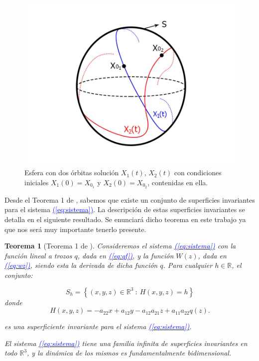 \documentclass[12pt,a4paper]{report} %
\newtheorem{theorem}{Teorema}[chapter]
\newcommand{\eref}[1]{\hyperref[#1]{\textcolor{blue}{(\ref*{#1})}}}
\newcommand{\eref}[1]{\hyperref[#1]{\textcolor{blue}{\textit{(\ref*{#1})}}}}
\begin{document}
	\begin{figure}[h]
		\centering
		\includegraphics[width=1\textwidth]{esfera.jpg}
		\caption{Esfera con dos órbitas solución $X_1(t)$, $X_2(t)$ con condiciones iniciales $X_1(0)=X_{0_1}$ y $X_2(0)=X_{0_2}$, contenidas en ella.}
		\label{fig:esfera}
	\end{figure}\smallskip
	\newpage
	
	Desde el Teorema 1 de \cite{ponce}, sabemos que existe un conjunto de superficies invariantes para el sistema \eref{eq:sistema}. La descripción de estas superficies invariantes se detalla en el siguiente resultado. Se enunciará dicho teorema en este trabajo ya que nos será muy importante tenerlo presente.

	\begin{theorem}[Teorema 1 de \cite{ponce}]
		\label{teorema1}
		Consideremos el sistema \eref{eq:sistema} con la función lineal a trozos $q$, dada en \eref{eq:qf}, y la función $W(z)$, dada en \eref{eq:wz}, siendo esta la derivada de dicha función $q$. Para cualquier $h \in \mathbb{R}$, el conjunto:
		
		\begin{equation}
			\label{eq:sh}
			S_h=\left\{(x,y,z)\in \mathbb{R}^3\: : \: H(x,y,z)=h \right\}
		\end{equation}
		donde
		\begin{equation}
			\label{eq:hecuation}
			H(x,y,z)=-a_{22}x+a_{12}y-a_{12}a_{21}z+a_{11}a_{22}q(z).
		\end{equation}\smallskip
		
		\noindent es una superficiente invariante para el sistema \eref{eq:sistema}.
		
		\vspace{0.5cm}\noindent El sistema \eref{eq:sistema} tiene una familia infinita de superficies invariantes en todo $\mathbb{R}^3$, y la dinámica de los mismos es fundamentalmente bidimensional.
	\end{theorem}
	
\end{document}
